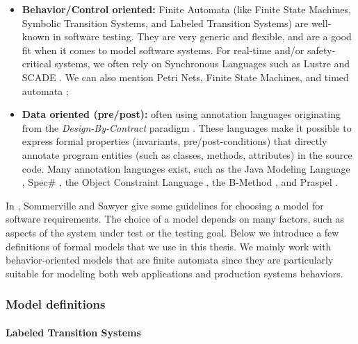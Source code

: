 \begin{itemize}
    \item \textbf{Behavior/Control oriented:} Finite Automata (like
        Finite State Machines, Symbolic Transition Systems, and Labeled
        Transition Systems) are well-known in software testing. They are
        very generic and flexible, and are a good fit when it comes to
        model software systems. For real-time and/or safety-critical
        systems, we often rely on Synchronous Languages such as Lustre
        \cite{lustre:ieee} and SCADE
        \cite{LeSergent:2011:SCF:2188575.2188578}. We can also mention
        Petri Nets, Finite State Machines, and timed automata
        \cite{Alur94atheory};

    \item \textbf{Data oriented (pre/post):} often using annotation
        languages originating from the \textit{Design-By-Contract}
        paradigm \cite{Meyer:1992:ADC:618974.619797}. These languages
        make it possible to express formal properties (invariants,
        pre/post-conditions) that directly annotate program entities
        (such as classes, methods, attributes) in the source code. Many
        annotation languages exist, such as the Java Modeling Language
        \cite{jml}, Spec\# \cite{117852}, the Object Constraint Language
        \cite{Warmer:1998:OCL:291202}, the B-Method
        \cite{Lano:1996:BLM:525749}, and Praspel
\cite{Enderlin:2011:PSL:2075545.2075551}.
\end{itemize}

In \cite{Sommerville:1997:REG:549198}, Sommerville and Sawyer
give some guidelines for choosing a model for software
requirements. The choice of a model depends on many factors, such
as aspects of the system under test or the testing goal.  Below
we introduce a few definitions of formal models that we use in
this thesis. We mainly work with behavior-oriented models that
are finite automata since they are particularly suitable for
modeling both web applications and production systems behaviors.

\subsubsection{Model definitions}

\paragraph{Labeled Transition Systems}
\label{sec:definitions:lts}

